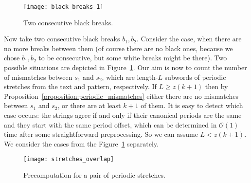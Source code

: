 \documentclass[runningheads]{llncs}
\begin{document}
\begin{figure}[t]
\texttt{[image: black\_breaks\_1]}
\caption{Two consecutive black breaks.}
\label{figure:black_breaks_1}
\end{figure}

Now take two consecutive black breaks $b_1, b_2$. Consider the case, when there are no more breaks between them (of course there are no black ones, because we chose $b_1, b_2$ to be consecutive, but some white breaks might be there). Two possible situations are depicted in Figure~\ref{figure:black_breaks_1}. 
Our aim is now to count the number of mismatches between $s_1$ and $s_2$, which are length-$L$ subwords of periodic stretches from the text and pattern, respectively. If $L\geq z(k+1)$ then by Proposition~\ref{proposition:periodic_mismatches} either there are no mismatches between $s_1$ and $s_2$, or there are at least $k+1$ of them. It is easy to detect which case occurs: the strings agree if and only if their canonical periods are the same and they start with the same period offset, which can be determined in $\mathcal{O}(1)$ time after some straightforward preprocessing. So we can assume $L<z(k+1)$. We consider the cases from the Figure~\ref{figure:black_breaks_1} separately.

\begin{figure}[t]
\centering
\texttt{[image: stretches\_overlap]}
\caption{Precomputation for a pair of periodic stretches.}
\label{figure:stretches_overlap}
\end{figure}
\end{document}
